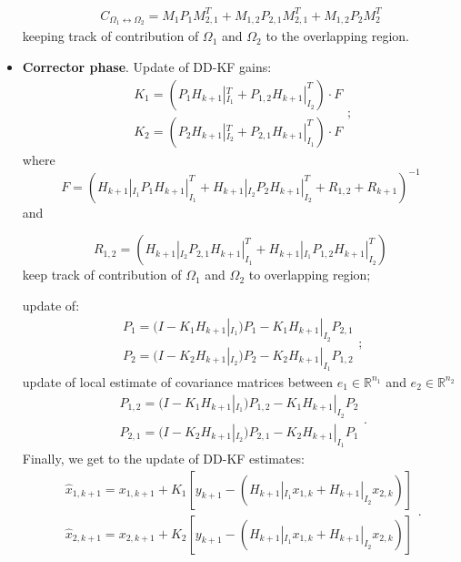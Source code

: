 \documentclass[smallcondensed]{svjour3}
\begin{document}
\begin{itemize}
\begin{equation}\label{mat_C}
\begin{array}{ll}
C_{\Omega_{1}\leftrightarrow \Omega_{2}} =M_{1}P_{1}M_{2,1}^{T}+M_{1,2}P_{2,1}M_{2,1}^{T}+M_{1,2}P_{2}M_{2}^{T}
\end{array}
\end{equation}
keeping track of contribution of  $\Omega_{1}$ and $\Omega_{2}$ to  the overlapping region.\\



\item {\bf Corrector phase}. Update of   DD-KF gains:
\begin{equation}\label{guadagnodikalman_DD}
\begin{array}{ll}
K_{1}=(P_{1}H_{k+1}|_{I_{1}}^{T}+P_{1,2}H_{k+1}|_{I_{2}}^{T})\cdot F \\
K_{2}=(P_{2}H_{k+1}|_{I_{2}}^{T}+P_{2,1}H_{k+1}|_{I_{1}}^{T})\cdot F
\end{array};
\end{equation}
where
\begin{equation}\label{matF}
    F=(H_{k+1}|_{I_{1}}P_{1}H_{k+1}|_{I_{1}}^{T}+H_{k+1}|_{I_{2}}P_{2}H_{k+1}|_{I_{2}}^{T}+R_{1,2}+R_{k+1})^{-1}
\end{equation}
and 

\begin{equation}\label{R12}
R_{1,2}=(H_{k+1}|_{I_{2}}P_{2,1}H_{k+1}|_{I_{1}}^{T}+H_{k+1}|_{I_{1}}P_{1,2}H_{k+1}|_{I_{2}}^{T})
\end{equation}
  keep track of  contribution of $\Omega_{1}$ and $\Omega_{2}$ to  overlapping region;
  
  
 update of:
\begin{equation}\label{P1-P2}
\begin{array}{ll}
P_{1}=(I-K_{1}H_{k+1}|_{I_{1}})P_{1}-K_{1}H_{k+1}|_{I_{2}}P_{2,1}\\
P_{2}=(I-K_{2}H_{k+1}|_{I_{2}})P_{2}-K_{2}H_{k+1}|_{I_{1}}P_{1,2}
\end{array};
\end{equation}
update of  local estimate of  covariance matrices between $e_{1}\in \mathbb{R}^{n_{1}}$ and $e_{2}\in \mathbb{R}^{n_{2}}$
\begin{equation}\label{P12-P21}
\begin{array}{ll}
P_{1,2}=(I-K_{1}H_{k+1}|_{I_{1}})P_{1,2}-K_{1}H_{k+1}|_{I_{2}}P_{2}\\
P_{2,1}=(I-K_{2}H_{k+1}|_{I_{2}})P_{2,1}-K_{2}H_{k+1}|_{I_{1}}P_{1}
\end{array}.
\end{equation}
Finally, we get to the update of  DD-KF estimates:
\begin{equation}\label{stimastato_DD}
\begin{array}{ll}
\widehat{x}_{1,k+1}=x_{1,k+1}+K_{1}\left[y_{k+1}-(H_{k+1}|_{I_{1}}x_{1,k}+H_{k+1}|_{I_{2}}x_{2,k})\right] \\
\widehat{x}_{2,k+1}=x_{2,k+1}+K_{2}\left[y_{k+1}-(H_{k+1}|_{I_{1}}x_{1,k}+H_{k+1}|_{I_{2}}x_{2,k})\right]
\end{array}.
\end{equation}
\end{itemize}
\end{document}
